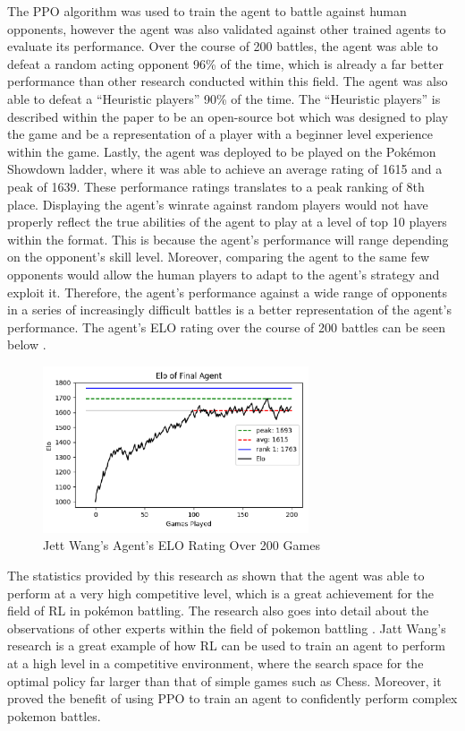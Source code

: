 The PPO algorithm was used to train the agent to battle against human opponents, however the agent was also validated against other trained agents to evaluate its performance. Over the course of 200 battles, the agent was able to defeat a random acting opponent 96\% of the time, which is already a far better performance than other research conducted within this field. The agent was also able to defeat a ``Heuristic players''  90\% of the time. The ``Heuristic players'' is described within the paper to be an open-source bot which was designed to play the game and be a representation of a player with a beginner level experience within the game. Lastly, the agent was deployed to be played on the Pokémon Showdown ladder, where it was able to achieve an average rating of 1615 and a peak of 1639. These performance ratings translates to a peak ranking of 8th place. Displaying the agent's winrate against random players would not have properly reflect the true abilities of the agent to play at a level of top 10 players within the format. This is because the agent's performance will range depending on the opponent's skill level. Moreover, comparing the agent to the same few opponents would allow the human players to adapt to the agent's strategy and exploit it. Therefore, the agent's performance against a wide range of opponents in a series of increasingly difficult battles is a better representation of the agent's performance. The agent's ELO rating over the course of 200 battles can be seen below \cite{wang2024winning}.

\begin{figure}[H]
    \centering
    \includegraphics[width=0.7\textwidth]{figures/literature_elo.png}
    \caption{Jett Wang's Agent's ELO Rating Over 200 Games}
    \label{fig:agent_elo}
\end{figure}

The statistics provided by this research as shown that the agent was able to perform at a very high competitive level, which is a great achievement for the field of RL in pokémon battling. The research also goes into detail about the observations of other experts within the field of pokemon battling \cite{wang2024winning}. Jatt Wang's research is a great example of how RL can be used to train an agent to perform at a high level in a competitive environment, where the search space for the optimal policy far larger than that of simple games such as Chess. Moreover, it proved the benefit of using PPO to train an agent to confidently perform complex pokemon battles. 

